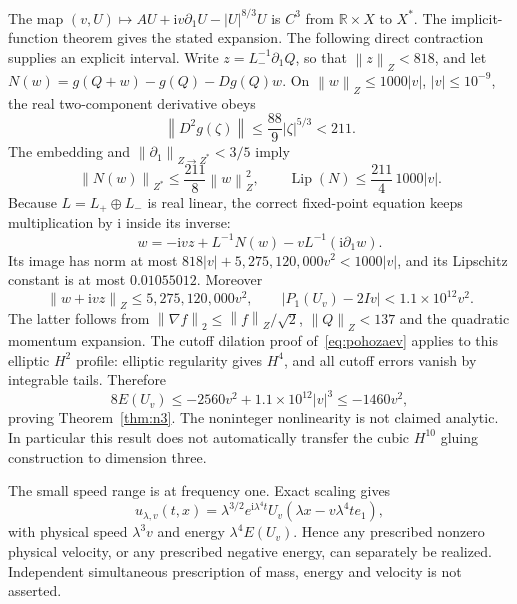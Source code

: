 \documentclass[11pt,a4paper]{article}
\theoremstyle{remark}\newtheorem{remark}[theorem]{Remark}
\newcommand{\R}{\mathbb R}\newcommand{\C}{\mathbb C}
\newcommand{\ii}{\mathrm i}\newcommand{\dd}{\,\mathrm d}
\newcommand{\norm}[1]{\left\|#1\right\|}
\begin{document}
The map $(v,U)\mapsto AU+\ii v\partial_1U-|U|^{8/3}U$ is $C^3$ from $\R\times X$ to $X^*$. The implicit-function theorem gives the stated expansion. The following direct contraction supplies an explicit interval. Write $z=L_-^{-1}\partial_1Q$, so that $\norm z_Z<818$, and let $N(w)=g(Q+w)-g(Q)-Dg(Q)w$. On $\norm w_Z\le1000|v|$, $|v|\le10^{-9}$, the real two-component derivative obeys
\[
 \norm{D^2g(\zeta)}\le\frac{88}{9}|\zeta|^{5/3}<211.
\]
The embedding and $\norm{\partial_1}_{Z\to Z^*}<3/5$ imply
\[
 \norm{N(w)}_{Z^*}\le\frac{211}{8}\norm w_Z^2,\qquad
 \operatorname{Lip}(N)\le\frac{211}{4}\,1000|v|.
\]
Because $L=L_+\oplus L_-$ is real linear, the correct fixed-point equation keeps multiplication by $\ii$ inside its inverse:
\[
 w=-\ii vz+L^{-1}N(w)-vL^{-1}(\ii\partial_1w).
\]
Its image has norm at most $818|v|+5{,}275{,}120{,}000v^2<1000|v|$, and its Lipschitz constant is at most $0.01055012$. Moreover
\[
 \norm{w+\ii vz}_Z\le5{,}275{,}120{,}000v^2,\qquad
 |P_1(U_v)-2Iv|<1.1\times10^{12}v^2.
\]
The latter follows from $\norm{\nabla f}_2\le\norm f_Z/\sqrt2$, $\norm Q_Z<137$ and the quadratic momentum expansion. The cutoff dilation proof of~\eqref{eq:pohozaev} applies to this elliptic $H^2$ profile: elliptic regularity gives $H^4$, and all cutoff errors vanish by integrable tails. Therefore
\[
 8E(U_v)\le-2560v^2+1.1\times10^{12}|v|^3\le-1460v^2,
\]
proving Theorem~\ref{thm:n3}. The noninteger nonlinearity is not claimed analytic. In particular this result does not automatically transfer the cubic $H^{10}$ gluing construction to dimension three.

The small speed range is at frequency one. Exact scaling gives
\[
 u_{\lambda,v}(t,x)=\lambda^{3/2}e^{\ii\lambda^4t}
 U_v(\lambda x-v\lambda^4te_1),
\]
with physical speed $\lambda^3v$ and energy $\lambda^4E(U_v)$. Hence any prescribed nonzero physical velocity, or any prescribed negative energy, can separately be realized. Independent simultaneous prescription of mass, energy and velocity is not asserted.
\end{document}
